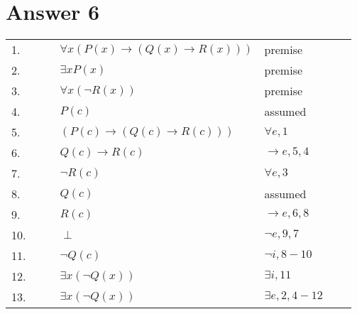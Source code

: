 \documentclass[12pt]{article}
\begin{document}
\section*{Answer 6}
\begin{table}[H]
	\centering
	\begin{tabular}{lllllll}
		1. & & & $\forall x (P(x) \rightarrow (Q(x) \rightarrow R(x)))$ & premise & & \\
		2. & & & $\exists x P(x)$ & premise & & \\  
		3. & & & $\forall x (\neg R(x))$ & premise & & \\ \cline{3-7}
		4. & \multicolumn{1}{c|}{} &  & $P(c)$ & assumed &  & \multicolumn{1}{c|}{} \\ 
		5. & \multicolumn{1}{c|}{} & & $(P(c) \rightarrow (Q(c) \rightarrow R(c)))$ & $\forall e,1 $ &  & \multicolumn{1}{c|}{} \\ 
		6. & \multicolumn{1}{c|}{} &  & $Q(c) \rightarrow R(c)$ & $\rightarrow e, 5, 4$ &  & \multicolumn{1}{c|}{} \\ 
		7. & \multicolumn{1}{c|}{} &  & $\neg R(c)$ & $\forall e, 3$ &  & \multicolumn{1}{c|}{} \\ \cline{4-6}
		8. & \multicolumn{1}{c|}{} & \multicolumn{1}{c|}{} & $Q(c)$ & assumed & \multicolumn{1}{c|}{} & \multicolumn{1}{c|}{} \\
		9. & \multicolumn{1}{c|}{} & \multicolumn{1}{c|}{} & $R(c)$ & $\rightarrow e,6,8 $ & \multicolumn{1}{c|}{} & \multicolumn{1}{c|}{} \\
		10. & \multicolumn{1}{c|}{} & \multicolumn{1}{c|}{} & $\perp$ & $\neg e, 9, 7$ & \multicolumn{1}{c|}{} & \multicolumn{1}{c|}{} \\ \cline{4-6}
		11. & \multicolumn{1}{c|}{} & & $\neg Q(c)$ & $\neg i,8-10$ & & \multicolumn{1}{c|}{} \\ 
		12. & \multicolumn{1}{c|}{} & & $\exists x (\neg Q(x))$ & $\exists i,11$ & & \multicolumn{1}{c|}{} \\ \cline{3-7}
		13. & & & $\exists x (\neg Q(x))$ & $\exists e, 2,4-12$ & & \\
		
	\end{tabular}
\end{table}
\end{document}

